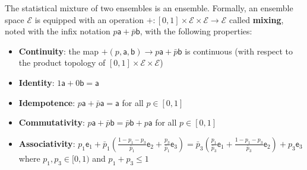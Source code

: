 \documentclass[10pt,twocolumn, nofootinbib]{revtex4-2}
\newcommand{\ens}[1][e] {\mathsf{#1}} %
\newcommand{\Ens}[1][E] {\mathcal{#1}} %
\begin{document}
\begin{axiom}\label{pm_es_axiomMixture}
	The statistical mixture of two ensembles is an ensemble. Formally, an ensemble space $\Ens$ is equipped with an operation $+ : [0, 1] \times \Ens \times \Ens \to \Ens$ called \textbf{mixing}, noted with the infix notation $p \ens[a] + \bar{p} \ens[b]$, with the following properties:
	\begin{itemize}
		\item \textbf{Continuity}: the map $+(p, \ens[a], \ens[b])  \to p \ens[a] + \bar{p} \ens[b]$ is continuous (with respect to the product topology of $[0, 1] \times \Ens \times \Ens$)
		\item \textbf{Identity}: $1 \ens[a] + 0 \ens[b] = \ens[a]$
		\item \textbf{Idempotence}:  $p \ens[a] + \bar{p} \ens[a] = \ens[a]$ for all $p \in [0,1]$
		\item \textbf{Commutativity}: $p \ens[a] + \bar{p} \ens[b] = \bar{p} \ens[b] + p \ens[a]$ for all $p \in [0,1]$
		\item \textbf{Associativity}: $p_1 \ens_1 + \bar{p}_1\left(\frac{1-p_1-p_3}{\bar{p}_1}\ens_2 + \frac{p_3}{\bar{p}_1}\ens_3\right) =  \bar{p}_3\left(\frac{p_1}{\bar{p}_3} \ens_1 +  \frac{1-p_1-p_3}{\bar{p}_3}\ens_2\right) + p_3 \ens_3$ where $p_1, p_3 \in [0,1)$ and $p_1 + p_3 \leq 1$
	\end{itemize}
\end{axiom}
\end{document}
